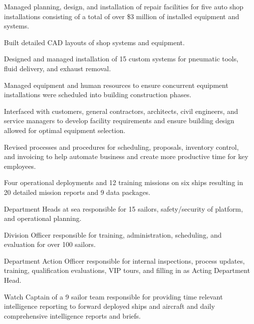 \vspace{\topsep} %
\begin{tightemize}
\item Managed planning, design, and installation of repair facilities for five auto shop installations consisting of a total of over \$3 million of installed equipment and systems.
\item Built detailed CAD layouts of shop systems and equipment.
\item Designed and managed installation of 15 custom systems for pneumatic tools, fluid delivery, and exhaust removal.
\item Managed equipment and human resources to ensure concurrent equipment installations were scheduled into building construction phases.
\item Interfaced with customers, general contractors, architects, civil engineers, and service managers to develop facility requirements and ensure building design allowed for optimal equipment selection.
\item Revised processes and procedures for scheduling, proposals, inventory control, and invoicing to help automate business and create more productive time for key employees.
\end{tightemize}
\sectionsep

\begin{tightemize}
\item Four operational deployments and 12 training missions on six ships resulting in 20 detailed mission reports and 9 data packages.
\item Department Heads at sea responsible for 15 sailors, safety/security of platform, and operational planning.
\item Division Officer responsible for training, administration, scheduling, and evaluation for over 100 sailors.
\item Department Action Officer responsible for internal inspections, process updates, training, qualification evaluations, VIP tours, and filling in as Acting Department Head.
\item Watch Captain of a 9 sailor team responsible for providing time relevant intelligence reporting to forward deployed ships and aircraft and daily comprehensive intelligence reports and briefs.
\end{tightemize}
\sectionsep
